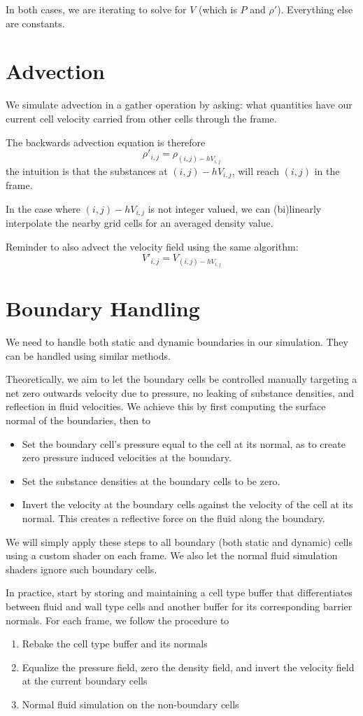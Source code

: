\documentclass[11pt]{article}
\begin{document}
In both cases, we are iterating to solve for $V$ (which is $P$ and $\rho'$). Everything else are constants.


\section{Advection}
We simulate advection in a gather operation by asking: what quantities have our current cell velocity carried from other cells through the frame.

The backwards advection equation is therefore
\[
    \rho'_{i,j} = \rho_{(i,j) - hV_{i,j}}
\]
the intuition is that the substances at $(i,j)-hV_{i,j}$, will reach $(i,j)$ in the frame.

In the case where $(i,j)-hV_{i,j}$ is not integer valued, we can (bi)linearly interpolate the nearby grid cells for an averaged density value.

Reminder to also advect the velocity field using the same algorithm:
\[
	V'_{i,j} = V_{(i,j) - hV_{i,j}}
\]

\section{Boundary Handling}
We need to handle both static and dynamic boundaries in our simulation. They can be handled using similar methods.

Theoretically, we aim to let the boundary cells be controlled manually targeting a net zero outwards velocity due to pressure, no leaking of substance densities, and reflection in fluid velocities. We achieve this by first computing the surface normal of the boundaries, then to
\begin{itemize}
    \item Set the boundary cell's pressure equal to the cell at its normal, as to create zero pressure induced velocities at the boundary.
    \item Set the substance densities at the boundary cells to be zero.
    \item Invert the velocity at the boundary cells against the velocity of the cell at its normal. This creates a reflective force on the fluid along the boundary.
\end{itemize}
We will simply apply these steps to all boundary (both static and dynamic) cells using a custom shader on each frame. We also let the normal fluid simulation shaders ignore such boundary cells.

In practice, start by storing and maintaining a cell type buffer that differentiates between fluid and wall type cells and another buffer for its corresponding barrier normals. For each frame, we follow the procedure to
\begin{enumerate}
    \item Rebake the cell type buffer and its normals
    \item Equalize the pressure field, zero the density field, and invert the velocity field at the current boundary cells
    \item Normal fluid simulation on the non-boundary cells
\end{enumerate}
\end{document}
